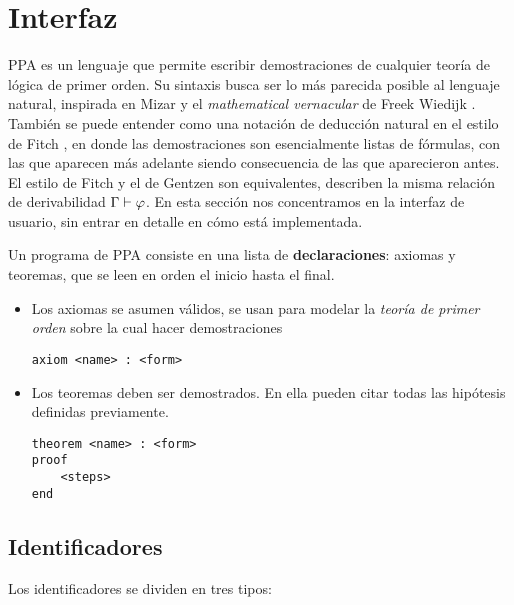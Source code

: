\section{Interfaz}

PPA es un lenguaje que permite escribir demostraciones de cualquier teoría de
lógica de primer orden. Su sintaxis busca ser lo más parecida posible al
lenguaje natural, inspirada en Mizar y el \textit{mathematical vernacular} de Freek Wiedijk \cite{freek-mv}. También se puede entender como una notación de
deducción natural en el estilo de Fitch \cite{sep-natural-deduction}, en donde
las demostraciones son esencialmente listas de fórmulas, con las que aparecen
más adelante siendo consecuencia de las que aparecieron antes. El estilo de
Fitch y el de Gentzen son equivalentes, describen la misma relación de
derivabilidad $\Gamma \vdash \varphi$. En esta sección nos
concentramos en la interfaz de usuario, sin entrar en detalle en cómo está
implementada.

Un programa de PPA consiste en una lista de \textbf{declaraciones}: axiomas y
teoremas, que se leen en orden el inicio hasta el final.

\begin{itemize}
    \item Los axiomas se asumen válidos, se usan para modelar la \textit{teoría
    de primer orden} sobre la cual hacer demostraciones

    \begin{lstlisting}[numbers=none]
axiom <name> : <form>
    \end{lstlisting}

    \item Los teoremas deben ser demostrados. En ella pueden citar
    todas las hipótesis definidas previamente.

    \begin{lstlisting}[numbers=none]
theorem <name> : <form>
proof
    <steps>
end
    \end{lstlisting}
\end{itemize}

\subsection{Identificadores}

Los identificadores se dividen en tres tipos:

